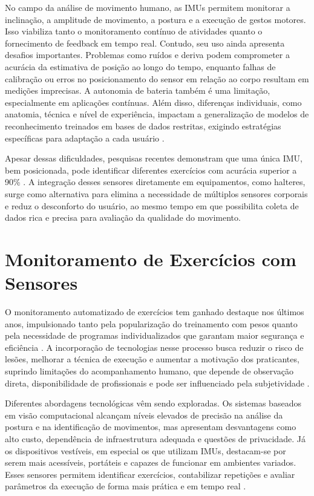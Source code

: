 No campo da análise de movimento humano, as IMUs permitem monitorar a inclinação, a amplitude de movimento, a postura e a execução de gestos motores. Isso viabiliza tanto o monitoramento contínuo de atividades quanto o fornecimento de feedback em tempo real. Contudo, seu uso ainda apresenta desafios importantes. Problemas como ruídos e deriva podem comprometer a acurácia da estimativa de posição ao longo do tempo, enquanto falhas de calibração ou erros no posicionamento do sensor em relação ao corpo resultam em medições imprecisas. A autonomia de bateria também é uma limitação, especialmente em aplicações contínuas. Além disso, diferenças individuais, como anatomia, técnica e nível de experiência, impactam a generalização de modelos de reconhecimento treinados em bases de dados restritas, exigindo estratégias específicas para adaptação a cada usuário \cite{dzaja-quantitative-nodate,balkhi-multipurpose-nodate}.  

Apesar dessas dificuldades, pesquisas recentes demonstram que uma única IMU, bem posicionada, pode identificar diferentes exercícios com acurácia superior a 90\% \cite{balkhi-multipurpose-nodate,pinto-aplicacao-2023}. A integração desses sensores diretamente em equipamentos, como halteres, surge como alternativa para elimina a necessidade de múltiplos sensores corporais e reduz o desconforto do usuário, ao mesmo tempo em que possibilita coleta de dados rica e precisa para avaliação da qualidade do movimento.

\section{Monitoramento de Exercícios com Sensores}

O monitoramento automatizado de exercícios tem ganhado destaque nos últimos anos, impulsionado tanto pela popularização do treinamento com pesos quanto pela necessidade de programas individualizados que garantam maior segurança e eficiência \cite{pinto-aplicacao-2023}. A incorporação de tecnologias nesse processo busca reduzir o risco de lesões, melhorar a técnica de execução e aumentar a motivação dos praticantes, suprindo limitações do acompanhamento humano, que depende de observação direta, disponibilidade de profissionais e pode ser influenciado pela subjetividade \cite{dzaja-quantitative-nodate,balkhi-multipurpose-nodate,gupta-yogahelp-2021}.  

Diferentes abordagens tecnológicas vêm sendo exploradas. Os sistemas baseados em visão computacional alcançam níveis elevados de precisão na análise da postura e na identificação de movimentos, mas apresentam desvantagens como alto custo, dependência de infraestrutura adequada e questões de privacidade. Já os dispositivos vestíveis, em especial os que utilizam IMUs, destacam-se por serem mais acessíveis, portáteis e capazes de funcionar em ambientes variados. Esses sensores permitem identificar exercícios, contabilizar repetições e avaliar parâmetros da execução de forma mais prática e em tempo real \cite{dzaja-quantitative-nodate,balkhi-multipurpose-nodate}.  

